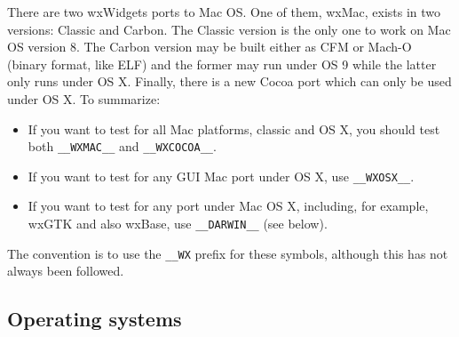 There are two wxWidgets ports to Mac OS. One of them, wxMac, exists in two versions: Classic and
Carbon. The Classic version is the only one to work on Mac OS version 8. The
Carbon version may be built either as CFM or Mach-O (binary format, like ELF)
and the former may run under OS 9 while the latter only runs under OS X.
Finally, there is a new Cocoa port which can only be used under OS X. To
summarize:

\begin{itemize}
\item If you want to test for all Mac platforms, classic and OS X, you
should test both \texttt{\_\_WXMAC\_\_} and \texttt{\_\_WXCOCOA\_\_}.
\item If you want to test for any GUI Mac port under OS X, use
\texttt{\_\_WXOSX\_\_}.
\item If you want to test for any port under Mac OS X, including, for
example, wxGTK and also wxBase, use \texttt{\_\_DARWIN\_\_} (see below).
\end{itemize}

The convention is to use the \texttt{\_\_WX} prefix for these
symbols, although this has not always been followed.

\subsection{Operating systems}\label{osconst}

\begin{twocollist}\itemsep=0pt
\end{twocollist}


